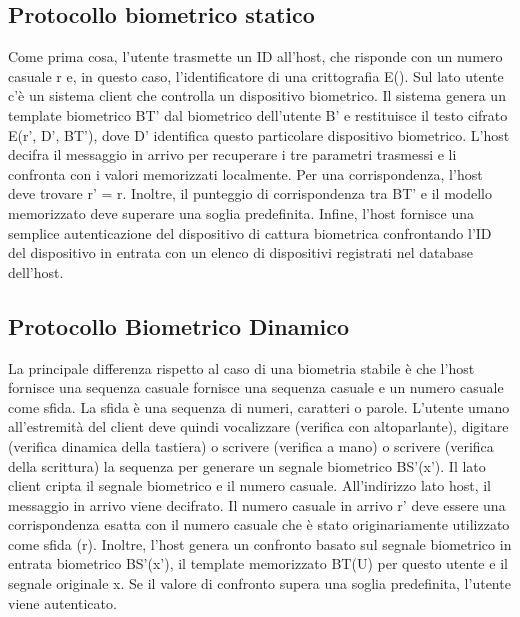 \subsection{Protocollo biometrico statico}
Come prima cosa, l'utente trasmette un ID all'host, che risponde con un numero casuale r e, in questo caso, l'identificatore di una crittografia E(). Sul lato utente c'è un sistema client che controlla un dispositivo biometrico. Il sistema genera un template biometrico BT' dal biometrico dell'utente B' e restituisce il testo cifrato E(r', D', BT'), dove D' identifica questo particolare dispositivo biometrico. L'host decifra il messaggio in arrivo per recuperare i tre parametri trasmessi e li confronta con i valori memorizzati localmente.
\singlespacing
Per una corrispondenza, l'host deve trovare r' = r. Inoltre, il punteggio di corrispondenza tra BT' e il modello memorizzato deve superare una soglia predefinita. Infine, l'host fornisce una semplice autenticazione del dispositivo di cattura biometrica confrontando l'ID del dispositivo in entrata con un elenco di dispositivi registrati nel database dell'host.
\subsection{Protocollo Biometrico Dinamico}
La principale differenza rispetto al caso di una biometria stabile è che l'host fornisce una sequenza casuale fornisce una sequenza casuale e un numero casuale come sfida. La sfida è una sequenza di numeri, caratteri o parole. L'utente umano all'estremità del client deve quindi vocalizzare (verifica con altoparlante), digitare (verifica dinamica della tastiera) o scrivere (verifica a mano) o scrivere (verifica della scrittura) la sequenza per generare un segnale biometrico BS'(x'). Il lato client cripta il segnale biometrico e il numero casuale. All'indirizzo lato host, il messaggio in arrivo viene decifrato. Il numero casuale in arrivo r' deve essere una corrispondenza esatta con il numero casuale che è stato originariamente utilizzato come sfida (r). Inoltre, l'host genera un confronto basato sul segnale biometrico in entrata biometrico BS'(x'), il template memorizzato BT(U) per questo utente e il segnale originale x. Se il valore di confronto supera una soglia predefinita, l'utente viene autenticato.